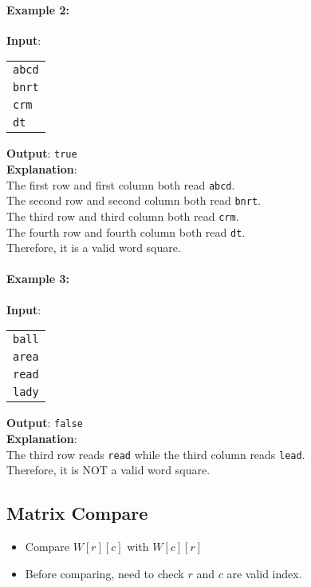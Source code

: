 

\paragraph{Example 2:}

\begin{flushleft}
\textbf{Input}:
\begin{table}[H]
\begin{tabular}{l}
\texttt{abcd} \\
\texttt{bnrt} \\
\texttt{crm} \\
\texttt{dt}
\end{tabular}
\end{table}

\textbf{Output}: \texttt{true}
\\
\textbf{Explanation}:
\\
The first row and first column both read \texttt{abcd}.
\\
The second row and second column both read \texttt{bnrt}.
\\
The third row and third column both read \texttt{crm}.
\\
The fourth row and fourth column both read \texttt{dt}.
\\
Therefore, it is a valid word square.
\end{flushleft}


\paragraph{Example 3:}
\begin{flushleft}
\textbf{Input}:
\begin{table}[H]
\begin{tabular}{l}
  \texttt{ball} \\
  \texttt{area} \\
  \texttt{read} \\
  \texttt{lady}
\end{tabular}
\end{table}
\textbf{Output}: \texttt{false}
\\
\textbf{Explanation}:
\\
The third row reads \texttt{read} while the third column reads \texttt{lead}.
\\
Therefore, it is NOT a valid word square.
\end{flushleft}

\subsection{Matrix Compare}
\begin{itemize}
\item Compare $W[r][c]$ with $W[c][r]$
\item Before comparing, need to check $r$ and $c$ are valid index.
\end{itemize}

